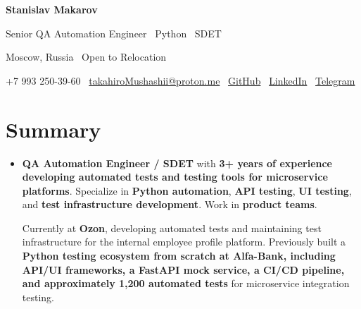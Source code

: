 \documentclass[letterpaper,11pt]{article}
\newcommand{\resumeSubHeadingListStart}{\begin{itemize}[leftmargin=0.15in, label={}]}
\newcommand{\resumeSubHeadingListEnd}{\end{itemize}}
\begin{document}

\begin{center}

{\Huge \textbf{Stanislav Makarov}}

\vspace{4pt}

{\large Senior QA Automation Engineer \textbar\ Python \textbar\ SDET}

\vspace{4pt}

Moscow, Russia \textbullet\ Open to Relocation

\vspace{6pt}

\small
+7 993 250-39-60 \textbar\
\href{mailto:takahiroMushashii@proton.me}{takahiroMushashii@proton.me}
\textbar\
\href{https://github.com/chyioIshi}{GitHub}
\textbar\
\href{https://linkedin.com/in/chyioIshi}{LinkedIn}
\textbar\
\href{https://t.me/makarovsvv}{Telegram}

\end{center}

\section{Summary}
    \resumeSubHeadingListStart
        \item{\textbf{QA Automation Engineer / SDET} with \textbf{3+ years of experience developing automated tests and testing tools for microservice platforms}.
        Specialize in \textbf{Python automation}, \textbf{API testing}, \textbf{UI testing}, and \textbf{test infrastructure development}.
        Work in \textbf{product teams}.

        Currently at \textbf{Ozon}, developing automated tests and maintaining test infrastructure for the internal employee profile platform.
        Previously built a \textbf{Python testing ecosystem from scratch at Alfa-Bank, including API/UI frameworks, a FastAPI mock service, a CI/CD pipeline,
        and approximately 1,200 automated tests} for microservice integration testing.}
    \resumeSubHeadingListEnd
\end{document}
